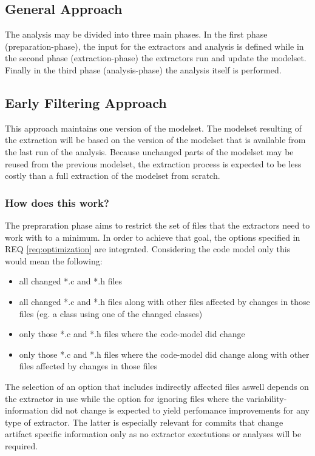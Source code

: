 \documentclass[a4paper]{article}
\begin{document}
\subsection{General Approach}

The analysis may be divided into three main phases. In the first phase (preparation-phase), the input for the extractors and analysis is defined while in the second phase (extraction-phase) the extractors run and update the modelset. Finally in the third phase (analysis-phase) the analysis itself is performed.


\subsection{Early Filtering Approach} \label{early}

This approach maintains one version of the modelset. The modelset resulting of the extraction will be based on the version of the modelset that is available from the last run of the analysis. Because unchanged parts of the modelset may be reused from the previous modelset, the extraction process is expected to be less costly than a full extraction of the modelset from scratch.

\subsubsection{How does this work?}

The prepraration phase aims to restrict the set of files that the extractors need to work with to a minimum. In order to achieve that goal, the options specified in REQ \ref{req:optimization}  are integrated. Considering the code model only this would mean the following:

\begin{itemize}
	\item all changed *.c and *.h files
	\item all changed *.c and *.h files along with other files affected by changes in those files (eg. a class using one of the changed classes)
	\item only those *.c and *.h files where the code-model did change
	\item only those *.c and *.h files where the code-model did change along with other files affected by changes in those files
\end{itemize}

The selection of an option that includes indirectly affected files aswell depends on the extractor in use while the option for ignoring files where the variability-information did not change is expected to yield perfomance improvements for any type of extractor. The latter is especially relevant for commits that change artifact specific information only as no extractor exectutions or analyses will be required.
\end{document}
